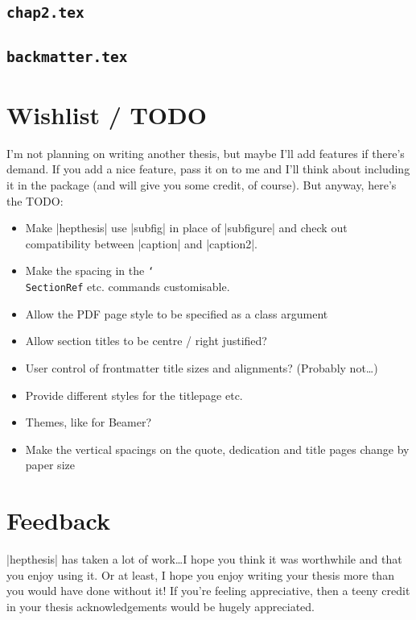 \documentclass[12pt]{article}
\newcommand{\texcmd}[1]{\texttt{\char`\\#1}}
\begin{document}
\subsection{\texttt{chap2.tex}}
{\smaller {}}

\subsection{\texttt{backmatter.tex}}
{\smaller {}}


\section{Wishlist / TODO}
I'm not planning on writing another thesis, but maybe I'll add features if
there's demand. If you add a nice feature, pass it on to me and I'll think about
including it in the package (and will give you some credit, of course). But anyway, 
here's the TODO:
%
\begin{itemize}
\item Make |hepthesis| use |subfig| in place of |subfigure| and check out compatibility between |caption| and |caption2|.
\item Make the spacing in the \texcmd{SectionRef} etc. commands customisable.
\item Allow the PDF page style to be specified as a class argument
\item Allow section titles to be centre / right justified?
\item User control of frontmatter title sizes and alignments? (Probably not\dots)
\item Provide different styles for the titlepage etc.
\item Themes, like for Beamer?
\item Make the vertical spacings on the quote, dedication and title pages change by paper size
\end{itemize}


\section{Feedback}
|hepthesis| has taken a lot of work\dots I hope you think it was worthwhile and
that you enjoy using it. Or at least, I hope you enjoy writing your thesis more
than you would have done without it! If you're feeling appreciative, then a teeny
credit in your thesis acknowledgements would be hugely appreciated.
\end{document}
